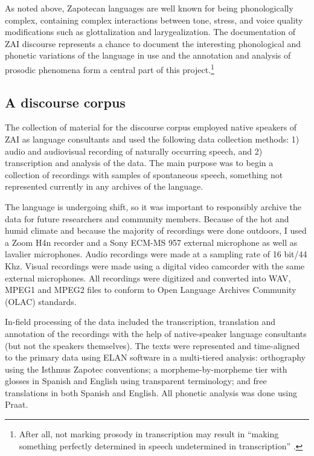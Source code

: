 As noted above, Zapotecan languages are well known for being phonologically complex, containing complex interactions between tone, stress, and voice quality modifications such as glottalization and larygealization. The documentation of ZAI discourse represents a chance to document the interesting phonological and phonetic variations of the language in use and the annotation and analysis of prosodic phenomena form a central part of this project.\footnote{After all, not marking prosody in transcription may result in ``making something perfectly determined in speech undetermined in transcription'' \citep[57]{scarano2009}.}  



\subsection{A discourse corpus}

The collection of material for the discourse corpus employed native speakers of ZAI as language consultants and used the following data collection methods: 1) audio and audiovisual recording of naturally occurring speech, and 2) transcription and analysis of the data. The main purpose was to begin a collection of recordings with samples of spontaneous speech, something not represented currently in any archives of the language. 

The language is undergoing shift, so it was important to responsibly archive the data for future researchers and community members. Because of the hot and humid climate and because the majority of recordings were done outdoors, I used a Zoom H4n recorder and a Sony ECM-MS 957 external microphone as well as lavalier microphones. Audio recordings were made at a sampling rate of 16 bit/44 Khz. Visual recordings were made using a digital video camcorder with the same external microphones. All recordings were digitized and converted into WAV, MPEG1 and MPEG2 files to conform to Open Language Archives Community (OLAC) standards. 

In-field processing of the data included the transcription, translation and annotation of the recordings with the help of native-speaker language consultants (but not the speakers themselves). The texts were represented and time-aligned to the primary data using ELAN software in a multi-tiered analysis: orthography using the Isthmus Zapotec conventions; a morpheme-by-morpheme tier with glosses in Spanish and English using transparent terminology; and free translations in both Spanish and English. All phonetic analysis was done using Praat. 


